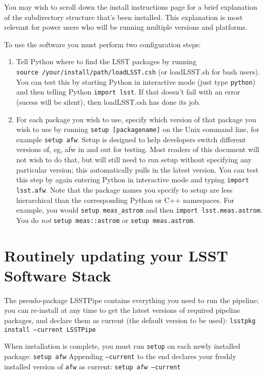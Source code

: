 You may wish to scroll down the install instructions page for a brief
explanation of the subdirectory structure that's been installed.  This
explanation is most relevant for power users who will be running
multiple versions and platforms.

To use the software you must perform two configuration steps:
\begin{enumerate}
\item Tell Python where to find the LSST packages by
  running \\ \texttt{source /your/install/path/loadLSST.csh} (or loadLSST.sh
  for bash users).  You can test this by starting Python in
  interactive mode (just type \texttt{python}) and then telling Python
  \texttt{import lsst}.  If that doesn't fail with an error (sucess
  will be silent), then loadLSST.csh has done its job.

\item For each package you wish to use, specify which version of that
  package you wish to use by running \texttt{setup [packagename]} on the
  Unix command line, for example \texttt{setup afw}.  Setup is designed to
  help developers switch different versions of, eg, afw in and out for
  testing.  Most readers of this document will not wish to do that,
  but will still need to run setup without specifying any particular
  version; this automatically pulls in the latest version.  You can
  test this step by again entering Python in interactive mode and
  typing \texttt{import lsst.afw}.  Note that the package names you specify
  to setup are less hierarchical than the corresponding Python or C++
  namespaces.  For example, you would \texttt{setup meas\_astrom} and then
  \texttt{import lsst.meas.astrom}.  You do {\it not} \texttt{setup meas::astrom} or 
  \texttt{setup meas.astrom}.

\end{enumerate}

\section{Routinely updating your LSST Software Stack}

The pseudo-package LSSTPipe contains everything you need to run the pipeline; you can re-install at any time to get the latest versions of required pipeline packages, and declare them as current (the default version to be used):
\texttt{lsstpkg install --current LSSTPipe}

When installation is complete, you must run \texttt{setup} on each newly installed package:
\texttt{setup afw}
Appending \texttt{--current} to the end declares your freshly installed version of \texttt{afw} as current:
\texttt{setup afw --current} 

